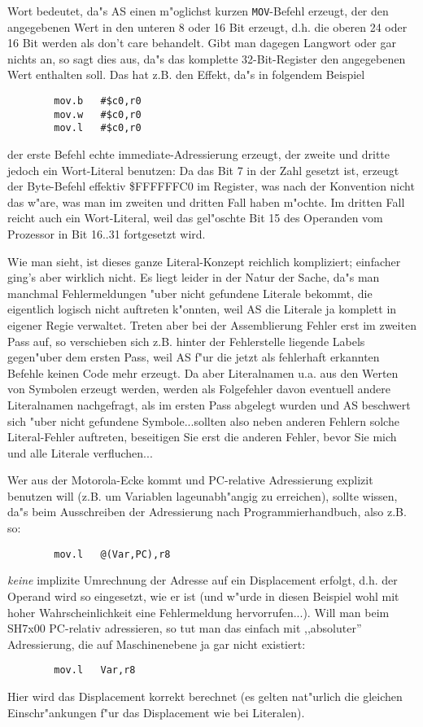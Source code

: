 \documentclass[12pt,a4paper,twoside]{report}
\newcommand{\tty}[1]{{\tt #1}}
\begin{document}
{Wort bedeutet, da"s AS einen m"oglichst kurzen \tty{MOV}-Befehl erzeugt,
der den angegebenen Wert in den unteren 8 oder 16 Bit erzeugt, d.h.
die oberen 24 oder 16 Bit werden als don't care behandelt.  Gibt
man dagegen Langwort oder gar nichts an, so sagt dies aus, da"s
das komplette 32-Bit-Register den angegebenen Wert enthalten soll.
Das hat z.B. den Effekt, da"s in folgendem Beispiel
\begin{verbatim}
        mov.b   #$c0,r0
        mov.w   #$c0,r0
        mov.l   #$c0,r0
\end{verbatim}
der erste Befehl echte immediate-Adressierung erzeugt, der zweite und
dritte jedoch ein Wort-Literal benutzen: Da das Bit 7 in der Zahl gesetzt
ist, erzeugt der Byte-Befehl effektiv \$FFFFFFC0 im Register, was nach
der Konvention nicht das w"are, was man im zweiten und dritten Fall haben
m"ochte.  Im dritten Fall reicht auch ein Wort-Literal, weil das gel"oschte
Bit 15 des Operanden vom Prozessor in Bit 16..31 fortgesetzt wird.
\par
Wie man sieht, ist dieses ganze Literal-Konzept reichlich kompliziert;
einfacher ging's aber wirklich nicht.  Es liegt leider in der Natur
der Sache, da"s man manchmal Fehlermeldungen "uber nicht gefundene
Literale bekommt, die eigentlich logisch nicht auftreten k"onnten, weil
AS die Literale ja komplett in eigener Regie verwaltet.  Treten aber bei
der Assemblierung Fehler erst im zweiten Pass auf, so verschieben sich
z.B. hinter der Fehlerstelle liegende Labels gegen"uber dem ersten Pass,
weil AS f"ur die jetzt als fehlerhaft erkannten Befehle keinen Code mehr
erzeugt.  Da aber Literalnamen u.a. aus den Werten von Symbolen erzeugt
werden, werden als Folgefehler davon eventuell andere Literalnamen
nachgefragt, als im ersten Pass abgelegt wurden und AS beschwert sich
"uber nicht gefundene Symbole...sollten also neben anderen Fehlern solche
Literal-Fehler auftreten, beseitigen Sie erst die anderen Fehler, bevor
Sie mich und alle Literale verfluchen...
\par
Wer aus der Motorola-Ecke kommt und PC-relative Adressierung explizit
benutzen will (z.B. um Variablen lageunabh"angig zu erreichen), sollte
wissen, da"s beim Ausschreiben der Adressierung nach Programmierhandbuch,
also z.B. so:
\begin{verbatim}
        mov.l   @(Var,PC),r8
\end{verbatim}
{\it keine} implizite Umrechnung der Adresse auf ein Displacement erfolgt,
d.h. der Operand wird so eingesetzt, wie er ist (und w"urde in diesen
Beispiel wohl mit hoher Wahrscheinlichkeit eine Fehlermeldung
hervorrufen...).  Will man beim SH7x00 PC-relativ adressieren, so tut man
das einfach mit ,,absoluter'' Adressierung, die auf Maschinenebene ja
gar nicht existiert:
\begin{verbatim}
        mov.l   Var,r8
\end{verbatim}
Hier wird das Displacement korrekt berechnet (es gelten nat"urlich die
gleichen Einschr"ankungen f"ur das Displacement wie bei Literalen).

}
\end{document}
